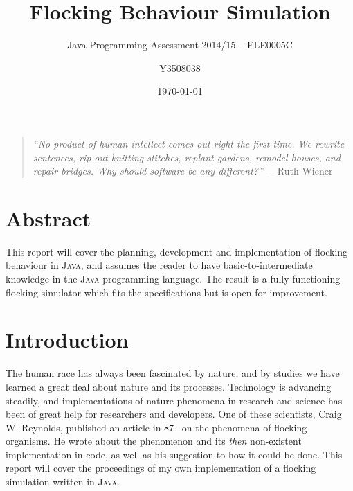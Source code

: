 \documentclass[a4paper,twoside, 10pt]{report}
\begin{document}
    \title{Flocking Behaviour Simulation}

    \subtitle{Java Programming Assessment 2014/15 -- ELE0005C}
    
    \author{Y3508038}
    
    \date{\today}

\maketitle

\tableofcontents 
\vfill

\begin{quotation}
\textit{``No product of human intellect comes out right the first time. We rewrite sentences, rip out knitting stitches, replant gardens, remodel houses, and repair bridges. Why should software be any different?''}~--~Ruth Wiener~\cite{Wiener93quote}
\end{quotation}

\vfill
\section*{Abstract}
This report will cover the planning, development and implementation of flocking behaviour in \textsc{Java}, and assumes the reader to have basic-to-intermediate knowledge in the \textsc{Java} programming language. The result is a fully functioning flocking simulator which fits the specifications but is open for improvement.

\vfill
\newpage






\section{Introduction}
\label{sec:intro}

The human race has always been fascinated by nature, and by studies we have learned a great deal about nature and its processes. Technology is advancing steadily, and implementations of nature phenomena in research and science has been of great help for researchers and developers. One of these scientists, Craig W. Reynolds, published an article in 87~\cite{reynolds87behavioral} on the phenomena of flocking organisms. He wrote about the phenomenon and its \textit{then} non-existent implementation in code, as well as his suggestion to how it could be done. This report will cover the proceedings of my own implementation of a flocking simulation written in \textsc{Java}. 
\end{document}
